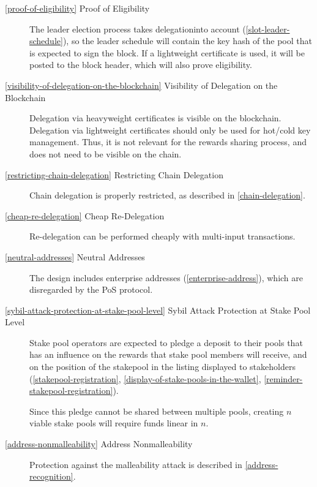 \documentclass[11pt,a4paper]{article}
\begin{document}
\begin{description}

\item[\cref{proof-of-eligibility} Proof of Eligibility] The leader
  election process takes delegationinto account
  (\cref{slot-leader-schedule}), so the leader schedule will contain
  the key hash of the pool that is expected to sign the block. If a
  lightweight certificate is used, it will be posted to the block
  header, which will also prove eligibility.

\item[\cref{visibility-of-delegation-on-the-blockchain} Visibility of
  Delegation on the Blockchain] Delegation via heavyweight
  certificates is visible on the blockchain. Delegation via
  lightweight certificates should only be used for hot/cold key
  management. Thus, it is not relevant for the rewards sharing
  process, and does not need to be visible on the chain.

\item[\cref{restricting-chain-delegation} Restricting Chain
  Delegation] Chain delegation is properly restricted, as described in
  \cref{chain-delegation}.

\item[\cref{cheap-re-delegation} Cheap Re-Delegation] Re-delegation can
  be performed cheaply with multi-input transactions.

\item[\cref{neutral-addresses} Neutral Addresses] The design includes
  enterprise addresses (\cref{enterprise-address}), which are
  disregarded by the PoS protocol.

\item[\cref{sybil-attack-protection-at-stake-pool-level} Sybil Attack
  Protection at Stake Pool Level] Stake pool operators are expected to
  pledge a deposit to their pools that has an influence on the rewards
  that stake pool members will receive, and on the position of the
  stakepool in the listing displayed to stakeholders
  (\cref{stakepool-registration},
  \cref{display-of-stake-pools-in-the-wallet},
  \cref{reminder-stakepool-registration}).

  Since this pledge cannot be shared between multiple pools, creating
  $n$ viable stake pools will require funds linear in $n$.

\item[\cref{address-nonmalleability} Address Nonmalleability]
  Protection against the malleability attack is described in
  \cref{address-recognition}.


\end{description}
\end{document}
